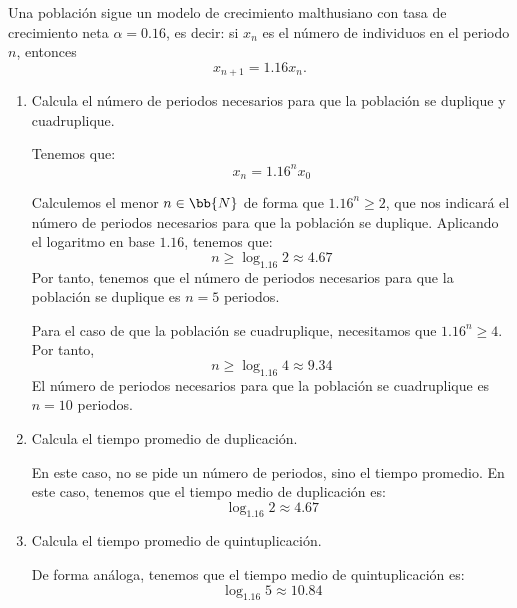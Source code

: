 \begin{ejercicio} 
Una población sigue un modelo de crecimiento malthusiano con tasa de crecimiento neta $\alpha = 0.16$, es decir: si $x_n$ es el número de individuos en el periodo $n$, entonces
$$x_{n+1} = 1.16 x_n.$$
    \begin{enumerate}
        \item Calcula el número de periodos necesarios para que la población se duplique y cuadruplique.

        Tenemos que:
        \begin{equation*}
            x_{n} = 1.16^n x_0
        \end{equation*}

        Calculemos el menor $n\in \bb{N}$ de forma que $1.16^n\geq 2$, que nos indicará el número de periodos necesarios para que la población se duplique.
        Aplicando el logaritmo en base $1.16$, tenemos que:
        \begin{equation*}
            n \geq \log_{1.16} 2 \approx 4.67
        \end{equation*}
        Por tanto, tenemos que el  número de periodos necesarios para que la población se duplique es $n=5$ periodos.
        
        Para el caso de que la población se cuadruplique, necesitamos que $1.16^n \geq 4$. Por tanto,
        \begin{equation*}
            n\geq \log_{1.16} 4 \approx 9.34
        \end{equation*}
        El  número de periodos necesarios para que la población se cuadruplique es $n=10$ periodos.
        
        \item Calcula el tiempo promedio de duplicación.

        En este caso, no se pide un número de periodos, sino el tiempo promedio. En este caso, tenemos que el tiempo medio de duplicación es:
        \begin{equation*}
            \log_{1.16} 2 \approx 4.67
        \end{equation*}
        
        \item Calcula el tiempo promedio de quintuplicación.

        De forma análoga, tenemos que el tiempo medio de quintuplicación es:
        \begin{equation*}
            \log_{1.16} 5 \approx 10.84
        \end{equation*}
    \end{enumerate}
\end{ejercicio}

